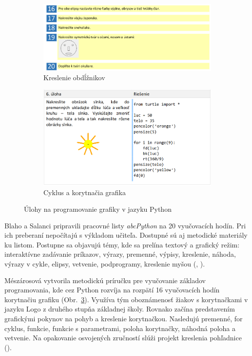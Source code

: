 \begin{figure}[h]
\centering
\begin{subfigure}[b]{0.55\textwidth}
\centering
\includegraphics[width=\textwidth]{assets/kucera-python.png}
\caption{Kreslenie obdĺžnikov}
\label{fig:kucera-kreslenie-python}
\end{subfigure}
\hfill
\begin{subfigure}[b]{0.44\textwidth}
\centering
\includegraphics[width=\textwidth]{assets/uloha-turtle.png}
\caption{Cyklus a korytnačia grafika}
\label{fig:turtle-graphics}
\end{subfigure}
\caption{Úlohy na programovanie grafiky v jazyku Python}
\end{figure}

Blaho a Salanci pripravili pracovné listy \emph{abcPython} na 20 vyučovacích hodín. Pri ich preberaní nepočítajú s výkladom učiteľa. Dostupné sú aj metodické materiály ku listom. Postupne sa objavujú témy, kde sa prelína textový a grafický režim: interaktívne zadávanie príkazov, výrazy, premenné, výpisy, kreslenie, náhoda, výrazy v cykle, elipsy, vetvenie, podprogramy, kreslenie myšou (\cite{blaho_abcpython_2019}, \cite{blaho_metodiky_2019}). 

Mészárosová vytvorila metodickú príručku pre vyučovanie základov programovania, kde cez Python rozvíja na rozpätí 16 vyučovacích hodín korytnačiu grafiku (Obr.~\ref{fig:turtle-graphics}). Využíva tým oboznámenosť žiakov s korytnačkami v jazyku Logo z druhého stupňa základnej školy. Rovnako začína predstavením grafickými pokynov na pohyb a kreslenie korytnačkou. Nasledujú premenné, for cyklus, funkcie, funkcie s parametrami, poloha korytnačky, náhodná poloha a vetvenie. Na opakovanie osvojených zručností slúži projekt kreslenia pohľadnice (\cite{meszarosova_python_2017}).

